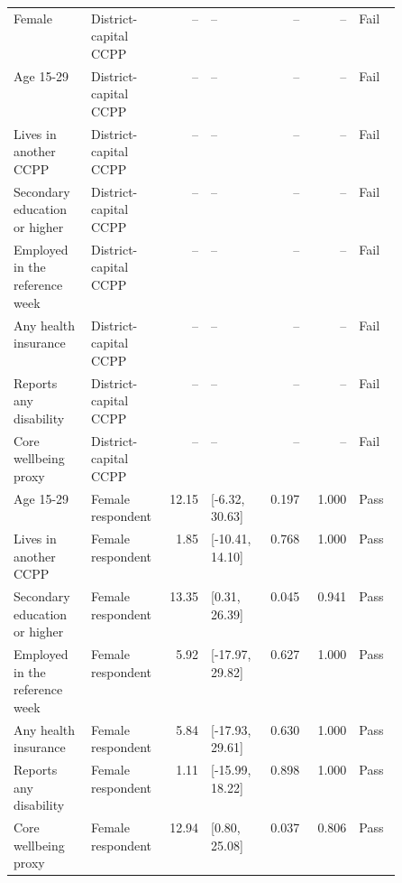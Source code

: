 \begin{longtable}{@{}p{0.20\linewidth}p{0.16\linewidth}rp{0.14\linewidth}rrl@{}}
Female & District-capital CCPP & -- & -- & -- & -- & Fail \\
Age 15-29 & District-capital CCPP & -- & -- & -- & -- & Fail \\
Lives in another CCPP & District-capital CCPP & -- & -- & -- & -- & Fail \\
Secondary education or higher & District-capital CCPP & -- & -- & -- & -- & Fail \\
Employed in the reference week & District-capital CCPP & -- & -- & -- & -- & Fail \\
Any health insurance & District-capital CCPP & -- & -- & -- & -- & Fail \\
Reports any disability & District-capital CCPP & -- & -- & -- & -- & Fail \\
Core wellbeing proxy & District-capital CCPP & -- & -- & -- & -- & Fail \\
Age 15-29 & Female respondent & 12.15 & [-6.32, 30.63] & 0.197 & 1.000 & Pass \\
Lives in another CCPP & Female respondent & 1.85 & [-10.41, 14.10] & 0.768 & 1.000 & Pass \\
Secondary education or higher & Female respondent & 13.35 & [0.31, 26.39] & 0.045 & 0.941 & Pass \\
Employed in the reference week & Female respondent & 5.92 & [-17.97, 29.82] & 0.627 & 1.000 & Pass \\
Any health insurance & Female respondent & 5.84 & [-17.93, 29.61] & 0.630 & 1.000 & Pass \\
Reports any disability & Female respondent & 1.11 & [-15.99, 18.22] & 0.898 & 1.000 & Pass \\
Core wellbeing proxy & Female respondent & 12.94 & [0.80, 25.08] & 0.037 & 0.806 & Pass \\
\end{longtable}
\endgroup

